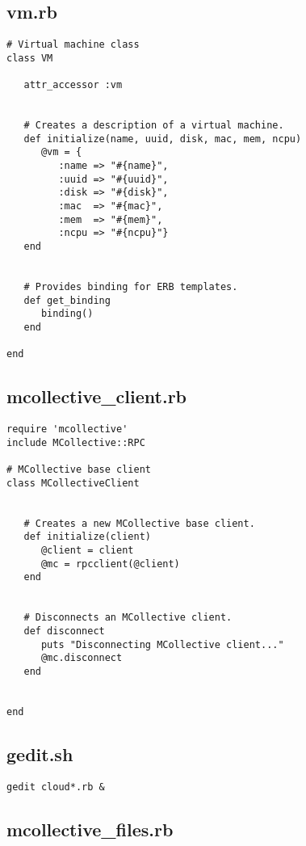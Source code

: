 \subsection{vm.rb}


\begin{lstlisting}
# Virtual machine class
class VM

   attr_accessor :vm
   
   
   # Creates a description of a virtual machine.
   def initialize(name, uuid, disk, mac, mem, ncpu)
      @vm = {
         :name => "#{name}",
         :uuid => "#{uuid}",
         :disk => "#{disk}",
         :mac  => "#{mac}",
         :mem  => "#{mem}",
         :ncpu => "#{ncpu}"}
   end
   
   
   # Provides binding for ERB templates.
   def get_binding
      binding()
   end
   
end
\end{lstlisting}


\subsection{mcollective\_client.rb}


\begin{lstlisting}
require 'mcollective'
include MCollective::RPC

# MCollective base client
class MCollectiveClient
   
   
   # Creates a new MCollective base client.
   def initialize(client)
      @client = client
      @mc = rpcclient(@client)
   end
   
   
   # Disconnects an MCollective client.
   def disconnect
      puts "Disconnecting MCollective client..."
      @mc.disconnect
   end
   
   
end
\end{lstlisting}


\subsection{gedit.sh}


\begin{lstlisting}
gedit cloud*.rb &
\end{lstlisting}


\subsection{mcollective\_files.rb}


